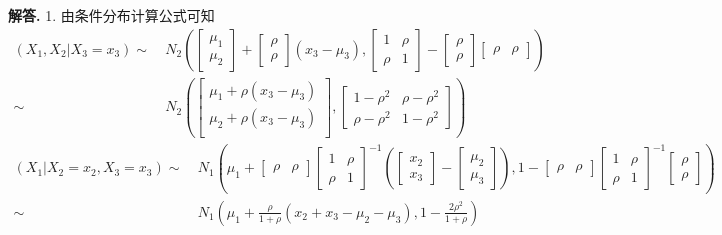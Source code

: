 \documentclass[12pt, a4paper, oneside]{ctexart}
\newenvironment{solution}[1][]{\par\noindent\textbf{#1解答. }}{\smallskip\par}  %
\begin{document}
\begin{solution}
    1. 由条件分布计算公式可知
    \begin{align*}
        (X_1,X_2|X_3 = x_3)\sim&\ N_2\left(\begin{bmatrix}
            \mu_1\\\mu_2
        \end{bmatrix}+\begin{bmatrix}
            \rho\\\rho
        \end{bmatrix}(x_3-\mu_3)
        ,\begin{bmatrix}
            1&\rho\\\rho&1
        \end{bmatrix} - \begin{bmatrix}
            \rho\\\rho
        \end{bmatrix}\begin{bmatrix}
            \rho&\rho
        \end{bmatrix}\right) \\
        \sim&\ N_2\left(\begin{bmatrix}
            \mu_1+\rho(x_3-\mu_3)\\
            \mu_2+\rho(x_3-\mu_3)\\
        \end{bmatrix},\begin{bmatrix}
            1-\rho^2&\rho-\rho^2\\
            \rho-\rho^2&1-\rho^2
        \end{bmatrix}\right)
    \end{align*}
    \begin{align*}
        (X_1|X_2=x_2,X_3=x_3)\sim&\ N_1\left(
            \mu_1+\begin{bmatrix}
                \rho&\rho
            \end{bmatrix}\begin{bmatrix}
                1&\rho\\\rho&1
            \end{bmatrix}^{-1}\left(\begin{bmatrix}
                x_2\\x_3
            \end{bmatrix}-\begin{bmatrix}
                \mu_2\\\mu_3
            \end{bmatrix}\right), 1-\begin{bmatrix}
                \rho&\rho
            \end{bmatrix}\begin{bmatrix}
                1&\rho\\\rho&1
            \end{bmatrix}^{-1}\begin{bmatrix}
                \rho\\\rho
            \end{bmatrix}\right)\\
            \sim&\ N_1\left(\mu_1+\frac{\rho}{1+\rho}(x_2+x_3-\mu_2-\mu_3), 1-\frac{2\rho^2}{1+\rho}\right)
    \end{align*}
    

\end{solution}
\end{document}
